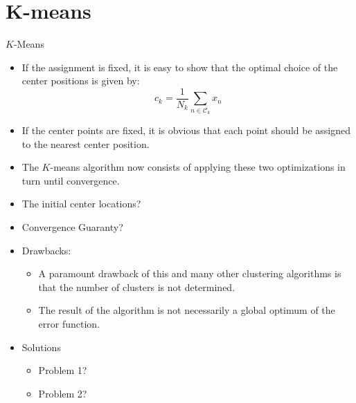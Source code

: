 \documentclass[compress,oilve]{beamer}
\newcommand{\tc}[2]{
	\textcolor{#1}{\hspace{-2pt}#2\hspace{-2pt}}
}
\begin{document}
\section{K-means}
\begin{frame}{$K$-Means}
	\begin{itemize}
	
		\item If the assignment is fixed, it is easy to show that the optimal choice of the center positions is given
		by:
		\begin{equation*}
			c_k = \frac{1}{N_k}\sum_{n\in\mathcal{C}_k}x_n
		\end{equation*}
		
		\item If the center points are fixed, it is obvious that each point should be assigned to the nearest center position.
		
		\medskip
		\item The $K$-means algorithm now consists of applying these two optimizations in turn until convergence.
		
		\medskip
		\item \tc{keywords}{The initial center locations?}
		
		\medskip
		\item \tc{keywords}{Convergence Guaranty?}
		
		\item \tc{keywords}{Drawbacks:}
		\begin{itemize}
			\item  A paramount drawback of this and many other clustering algorithms is that the number of clusters is not determined.
			
			\medskip
			\item  The result of the algorithm is not necessarily a global optimum of the error function.
		\end{itemize}
	
	\medskip
	\item \tc{keywords}{Solutions}
	\begin{itemize}
		\item Problem 1?
		
		\medskip
		\item 	Problem 2?
		
	\end{itemize}

	\end{itemize}

\end{frame}
\end{document}
